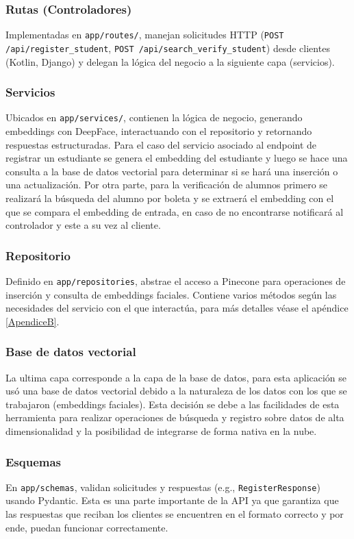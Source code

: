 \subsubsection*{Rutas (Controladores)}
Implementadas en \texttt{app/routes/}, manejan solicitudes HTTP (\texttt{POST /api/register\_student}, \texttt{POST /api/search\_verify\_student}) desde clientes (Kotlin, Django) y delegan la lógica del negocio a la siguiente capa (servicios).

\subsubsection*{Servicios}
Ubicados en \texttt{app/services/}, contienen la lógica de negocio, generando embeddings con DeepFace, interactuando con el repositorio y retornando respuestas estructuradas.
Para el caso del servicio asociado al endpoint de registrar un estudiante se genera el embedding del estudiante y luego se hace una consulta a la base de datos vectorial para determinar si se hará una inserción o una actualización. Por otra parte, para la verificación de alumnos primero se realizará la búsqueda del alumno por boleta y se extraerá el embedding con el que se compara el embedding de entrada, en caso de no encontrarse notificará al controlador y este a su vez al cliente.

\subsubsection*{Repositorio}
Definido en \texttt{app/repositories}, abstrae el acceso a Pinecone para operaciones de inserción y consulta de embeddings faciales. Contiene varios métodos según las necesidades del servicio con el que interactúa, para más detalles véase el apéndice \ref{ApendiceB}.

\subsubsection*{Base de datos vectorial}
La ultima capa corresponde a la capa de la base de datos, para esta aplicación se usó una base de datos vectorial debido a la naturaleza de los datos con los que se trabajaron (embeddings faciales).
Esta decisión se debe a las facilidades de esta herramienta para realizar operaciones de búsqueda y registro sobre datos de alta dimensionalidad y la posibilidad de integrarse de forma nativa en la nube.

\subsubsection*{Esquemas}
En \texttt{app/schemas}, validan solicitudes y respuestas (e.g., \texttt{RegisterResponse}) usando Pydantic. Esta es una parte importante de la API ya que garantiza que las respuestas que reciban los clientes se encuentren en el formato correcto y por ende, puedan funcionar correctamente.

